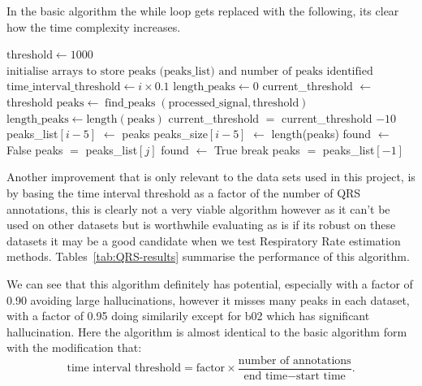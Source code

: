  In the basic algorithm the while loop gets replaced with the following, its clear how the time 
 complexity increases. 
\begin{algorithm}
\caption{Jump Based Modification to location of Processed Signals Peaks}
\begin{algorithmic}

    \State $\text{threshold} \gets 1000$
    \State $\text{initialise arrays to store peaks (peaks\_list) and
     number of peaks identified (peaks\_size)}$
        \State $\text{time\_interval\_threshold} \gets i \times 0.1$
        \State $\text{length\_peaks} \gets 0$
        \State current\_threshold $\gets$ threshold
                \State $\text{peaks} \gets \operatorname{\text{find\_peaks}}(\text{processed\_signal}, \text{threshold})$
                \State $\text{length\_peaks} \gets \text{length}(\text{peaks})$
                \State current\_threshold $=$ current\_threshold $-10$
        \EndWhile
        \State peaks\_list$[i-5]$ $\gets$ peaks
        \State peaks\_size$[i-5]$ $\gets$ length(peaks)
    \EndFor
    \State found $\gets$ False
                \State peaks $=$ peaks\_list$[j]$
                \State found $\gets$ True
                \State break
        \EndIf
    \EndFor
        peaks $=$ peaks\_list$[-1]$
    \EndIf

\end{algorithmic}
\end{algorithm}


Another improvement that is only relevant to the data sets used in this project, is by 
basing the time interval threshold as a factor of the number of QRS annotations, this is clearly not 
a very viable algorithm however as it can't be used on other datasets but is worthwhile 
evaluating as is if its robust on these datasets it may be a good candidate when 
we test Respiratory Rate estimation methods. Tables~\ref{tab:QRS-results}
 summarise the performance of this algorithm. 
\begin{table}[H]
    \centering
    \caption{Performance of the annotation based algorithm with factor 0.90 and 0.95}
    \label{tab:QRS-results}
\end{table}
We can see that this algorithm definitely has potential, especially with a factor of 0.90 
avoiding large hallucinations, however it misses many peaks in each dataset, with a factor of 0.95
doing similarily except for b02 which has significant hallucination.
 Here the algorithm is almost 
identical to the basic algorithm form with the modification that:
\[
\text{time interval threshold}
= \text{factor} \times
\frac{\text{number of annotations}}
{\text{end time} - \text{start time}}.
\] 





